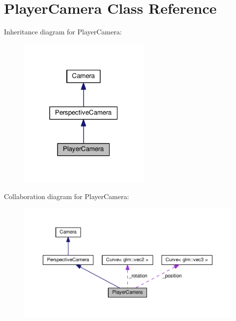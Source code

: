 \hypertarget{class_player_camera}{}\section{Player\+Camera Class Reference}
\label{class_player_camera}


Inheritance diagram for Player\+Camera\+:\nopagebreak
\begin{figure}[H]
\begin{center}
\leavevmode
\includegraphics[width=183pt]{class_player_camera__inherit__graph}
\end{center}
\end{figure}


Collaboration diagram for Player\+Camera\+:\nopagebreak
\begin{figure}[H]
\begin{center}
\leavevmode
\includegraphics[width=350pt]{class_player_camera__coll__graph}
\end{center}
\end{figure}

